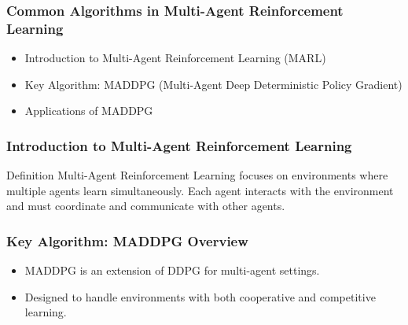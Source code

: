 \documentclass[aspectratio=169]{beamer}
\begin{document}
\begin{frame}[fragile]
    \frametitle{Common Algorithms in Multi-Agent Reinforcement Learning}
    
    \begin{itemize}
        \item Introduction to Multi-Agent Reinforcement Learning (MARL)
        \item Key Algorithm: MADDPG (Multi-Agent Deep Deterministic Policy Gradient)
        \item Applications of MADDPG
    \end{itemize}
\end{frame}

\begin{frame}[fragile]
    \frametitle{Introduction to Multi-Agent Reinforcement Learning}
    
    \begin{block}{Definition}
        Multi-Agent Reinforcement Learning focuses on environments where multiple agents learn simultaneously. Each agent interacts with the environment and must coordinate and communicate with other agents.
    \end{block}
\end{frame}

\begin{frame}[fragile]
    \frametitle{Key Algorithm: MADDPG Overview}
    
    \begin{itemize}
        \item MADDPG is an extension of DDPG for multi-agent settings.
        \item Designed to handle environments with both cooperative and competitive learning.
    \end{itemize}
\end{frame}
\end{document}
